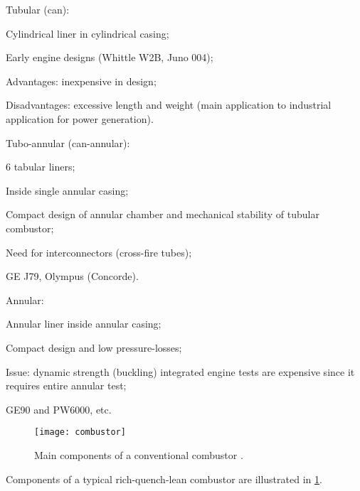 \begin{itemizePacked}
\item Tubular (can):
  \begin{itemizePacked}
  \item Cylindrical liner in cylindrical casing;
  \item Early engine designs (Whittle W2B, Juno 004);
  \item Advantages: inexpensive in design;
  \item Disadvantages: excessive length and weight (main application to industrial application for power generation).
  \end{itemizePacked}
\item Tubo-annular (can-annular):
  \begin{itemizePacked}
  \item 6 tabular liners;
  \item Inside single annular casing;
  \item Compact design of annular chamber and mechanical stability of tubular combustor;
  \item Need for interconnectors (cross-fire tubes);
  \item GE J79, Olympus (Concorde).
  \end{itemizePacked}
\item Annular:
  \begin{itemizePacked}
  \item Annular liner inside annular casing;
  \item Compact design and low pressure-losses;
  \item Issue: dynamic strength (buckling) integrated engine tests are expensive since it requires entire annular test;
  \item GE90 and PW6000, etc.
  \end{itemizePacked}
\end{itemizePacked}

\begin{figure}[!htb!]
\begin{center}
  \texttt{[image: combustor]}
  \caption{\label{FIG_COMBUSTOR}Main components of a conventional combustor \cite{LEFEBVRE_BOOK1999}.}
\end{center}
\end{figure}

Components of a typical rich-quench-lean combustor are illustrated in \cref{FIG_COMBUSTOR}.
